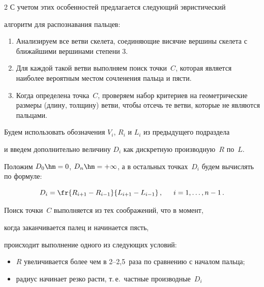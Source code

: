\begin{multicols}{2}
С учетом этих особенностей предлагается следующий эвристический 


алгоритм для распознавания пальцев:


\begin{enumerate}[1.]


\item Анализируем все ветви скелета, соединяющие висячие вершины скелета с ближайшими вершинами степени 3.


\item Для каждой такой ветви выполняем поиск точки~$C$, которая является наиболее вероятным местом сочленения пальца и пясти.


\item Когда определена точка~$C$, проверяем набор критериев на геометрические размеры (длину, толщину) ветви, чтобы отсечь те ветви, которые не являются пальцами.


\end{enumerate}





Будем использовать обозначения $V_i$, $R_i$ и $L_i$ из предыдущего подраздела


и введем дополнительно величину $D_i$ как дискретную производную~$R$ по~$L$.


Положим $D_0 \hm= 0$, $D_n \hm= + \infty$, а в остальных точках~$D_i$ будем вычислять по формуле:


\begin{equation*}


D_i = \fr{R_{i+1} - R_{i-1}}{L_{i+1} - L_{i - 1}}\,,\enskip \quad i = 1,


\ldots, n-1\,.


\end{equation*}





Поиск точки~$C$ выполняется из тех соображений, что в момент, 


когда заканчивается палец и начинается пясть,


происходит выполнение одного из следующих условий:


\begin{itemize}


\item $R$ увеличивается более чем в 2--2,5~раза по сравнению с началом пальца;


\item радиус начинает резко расти, т.\,е.\ частные производные~$D_i$ 



\end{itemize}
\end{multicols}
